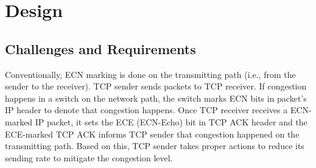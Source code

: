 \section{Design}
\label{rate-limiter:sec:design} 
\iffalse
The design requirements are 1) high throughput, 2) low throughput oscillation, 3) low latency and 4) generic. Here generic 
means the designed solution should be able to support different kinds of traffic (both north-south and east-west traffic)
in the datacenter network.
\fi
\iffalse
\subsection{Challenges and Requirements}

Conventionally, ECN marking is done on the transmitting path (i.e., from the sender to the receiver). 
TCP sender sends packets to TCP receiver. If congestion happens in a switch on the network path, 
the switch marks ECN bits in packet's IP header to denote that congestion happens. 
Once TCP receiver receives a ECN-marked IP packet, it sets the ECE (ECN-Echo) bit in TCP ACK header 
and the ECE-marked TCP ACK informs TCP sender that congestion happened on the transmitting path. 
Based on this, TCP sender takes proper actions to reduce its sending rate to mitigate the congestion level.

